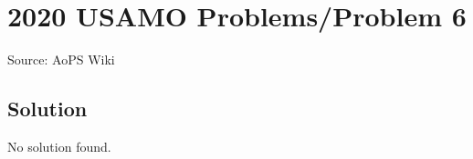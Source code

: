 \documentclass[12pt]{article}
\begin{document}
\section*{{2020 USAMO Problems/Problem 6}}
Source: AoPS Wiki

\subsection*{Solution}
No solution found.
\end{document}
